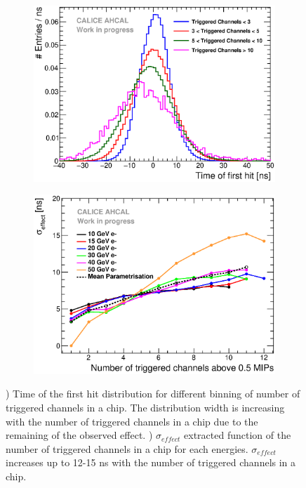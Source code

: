 \begin{figure}[htbp!]
	\begin{subfigure}[t]{0.49\textwidth}
		\centering
		\includegraphics[width=1\linewidth]{../Thesis_Plots/Timing/Electrons/Plots/TimingHitsBins_20GeV.eps}
		\caption{} \label{fig:ped_shift_dist_para}
	\end{subfigure}
	\hfill
	\begin{subfigure}[t]{0.49\textwidth}
		\centering
		\includegraphics[width=1\linewidth]{../Thesis_Plots/Timing/Electrons/Plots/MeanParametrisation.eps}
		\caption{} \label{fig:para_fit}
	\end{subfigure}
	\caption{) Time of the first hit distribution for different binning of number of triggered channels in a chip. The distribution width is increasing with the number of triggered channels in a chip due to the remaining of the observed effect. ) $\sigma_{effect}$ extracted function of the number of triggered channels in a chip for each energies. $\sigma_{effect}$ increases up to 12-15 ns with the number of triggered channels in a chip.}
\end{figure}


